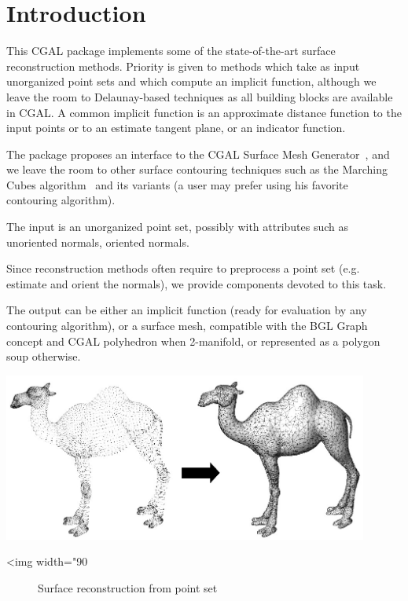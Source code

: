 \section{Introduction}

This CGAL package implements some
of the state-of-the-art surface reconstruction methods. Priority is
given to methods which take as input unorganized point sets and
which compute an implicit function, although we leave the room to
Delaunay-based techniques as all building blocks are available in
CGAL. A common implicit function is an approximate distance function
to the input points or to an estimate tangent plane, or an indicator
function.

The package proposes an interface to the CGAL Surface Mesh Generator~\cite{cgal:ry-gsddrm-06,cgal:bo-pgsms-05},
and we leave the room to other surface contouring techniques such
as the Marching Cubes algorithm~\cite{LC87} and its variants (a
user may prefer using his favorite contouring algorithm).

The input is an unorganized point set, possibly with attributes
such as unoriented normals, oriented normals.

Since reconstruction methods often require to preprocess a point set
(e.g. estimate and orient the normals), we provide components devoted
to this task.

The output can be either an implicit function (ready for evaluation
by any contouring algorithm), or a surface mesh, compatible with the
BGL Graph concept and CGAL polyhedron when 2-manifold, or represented
as a polygon soup otherwise.

\begin{center}
    \label{Surface_reconstruction_3-fig-introduction}
    \begin{ccTexOnly}
        \includegraphics[width=0.9\textwidth]{Surface_reconstruction_3/introduction} %
    \end{ccTexOnly}
    \begin{ccHtmlOnly}
        <img width="90%
    \end{ccHtmlOnly}
    \begin{figure}[h]
        \caption{Surface reconstruction from point set}
    \end{figure}
\end{center}


